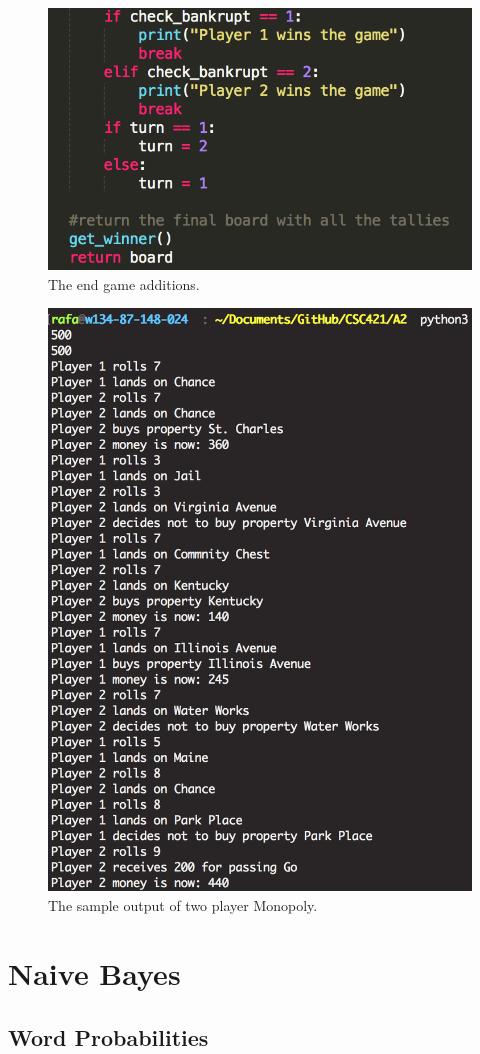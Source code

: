 \documentclass[12pt, letter]{article}
\begin{document}
 \begin{figure}[htb]
  \centering
  \includegraphics[width=0.7 \textwidth]{./figures/multi_2.png}
  \caption{The end game additions.}
\end{figure}

 \begin{figure}[htb]
  \centering
  \includegraphics[width=0.7 \textwidth]{./figures/sample_multi.png}
  \caption{The sample output of two player Monopoly.}
\end{figure}

\FloatBarrier


\section{Naive Bayes}

\subsection{Word Probabilities}
\end{document}
